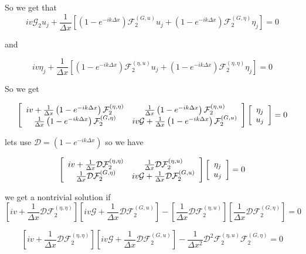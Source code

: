 \documentclass[12pt]{article}
\begin{document}
So we get that
\[iv\mathcal{G}_2u_j + \frac{1}{\Delta x}\left[\left(1 - e^{-ik\Delta x} \right)\mathcal{F}_2^{(G,u)}u_j 
+  \left(1 - e^{-ik\Delta x} \right)\mathcal{F}_2^{(G,\eta)} \eta_j\right] = 0\]

and 

\[iv\eta_j + \frac{1}{\Delta x}\left[\left(1 - e^{-ik\Delta x} \right)\mathcal{F}_2^{(\eta,u)}u_j 
+  \left(1 - e^{-ik\Delta x} \right)\mathcal{F}_2^{(\eta,\eta)} \eta_j\right] = 0\]

So we get

\[ \left[\begin{array}{c c}
iv + \frac{1}{\Delta x} \left(1 - e^{-ik\Delta x} \right)\mathcal{F}_2^{(\eta,\eta)}  & \frac{1}{\Delta x} \left(1 - e^{-ik\Delta x} \right)\mathcal{F}_2^{(\eta,u)}\\
\frac{1}{\Delta x} \left(1 - e^{-ik\Delta x} \right)\mathcal{F}_2^{(G,\eta)} &
iv\mathcal{G} + \frac{1}{\Delta x} \left(1 - e^{-ik\Delta x} \right)\mathcal{F}_2^{(G,u)} 
\end{array} \right] 
\left[\begin{array}{c}
\eta_j \\
u_j
\end{array} \right] = 0\]

lets use $\mathcal{D} = \left(1 - e^{-ik\Delta x} \right)$ so we have

\[ \left[\begin{array}{c c}
iv + \frac{1}{\Delta x} \mathcal{D}\mathcal{F}_2^{(\eta,\eta)}  & \frac{1}{\Delta x} \mathcal{D}\mathcal{F}_2^{(\eta,u)}\\
\frac{1}{\Delta x} \mathcal{D}\mathcal{F}_2^{(G,\eta)} &
iv\mathcal{G} + \frac{1}{\Delta x} \mathcal{D}\mathcal{F}_2^{(G,u)} 
\end{array} \right] 
\left[\begin{array}{c}
\eta_j \\
u_j
\end{array} \right] = 0\]

we get a nontrivial solution if 
\[\left[iv + \frac{1}{\Delta x} \mathcal{D}\mathcal{F}_2^{(\eta,\eta)}\right]\left[iv\mathcal{G} + \frac{1}{\Delta x} \mathcal{D}\mathcal{F}_2^{(G,u)}\right] - \left[\frac{1}{\Delta x} \mathcal{D}\mathcal{F}_2^{(\eta,u)}\right]\left[\frac{1}{\Delta x} \mathcal{D}\mathcal{F}_2^{(G,\eta)} \right] = 0\]

\[\left[iv + \frac{1}{\Delta x} \mathcal{D}\mathcal{F}_2^{(\eta,\eta)}\right]\left[iv\mathcal{G} + \frac{1}{\Delta x} \mathcal{D}\mathcal{F}_2^{(G,u)}\right] - \frac{1}{\Delta x^2} \mathcal{D}^2\mathcal{F}_2^{(\eta,u)}\mathcal{F}_2^{(G,\eta)} = 0\]
\end{document}
